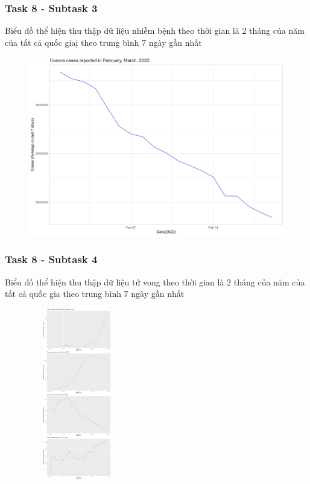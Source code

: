 \documentclass[english,10pt,table]{beamer}
\begin{document}
{
    \frametitle{Task 8 - Subtask 3}
    \begin{block}{Biểu đồ thể hiện thu thập dữ liệu nhiễm bệnh theo thời gian là 2 tháng của năm của tất cả quốc giaị theo trung bình 7 ngày gần nhất}
    \begin{figure}[H]
			\centering
			\includegraphics[scale=0.1]{images/8.3.3.png}
	\end{figure}
    \end{block}
}
\frame
{
    \frametitle{Task 8 - Subtask 4}
    \begin{block}{Biểu đồ thể hiện thu thập dữ liệu tử vong theo thời gian là 2 tháng của năm của tất cả quốc gia theo trung bình 7 ngày gần nhất}
    \begin{figure}[H]
			\centering
			\includegraphics[height=7.5cm,width=4.2cm]{images/8.4.1.png}
	\end{figure}
    \end{block}
}
\frame
\end{document}

